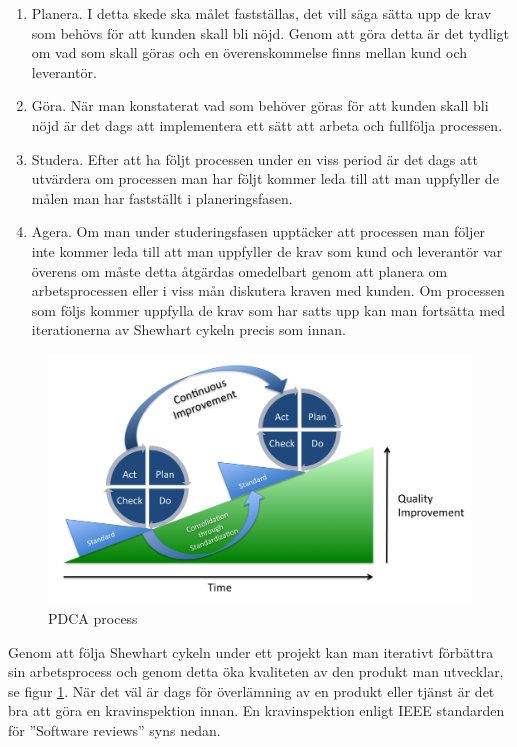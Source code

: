 \begin{enumerate}
  \item Planera. I detta skede ska målet fastställas, det vill säga sätta upp de krav som behövs för att kunden skall bli nöjd. Genom att göra detta är det tydligt om vad som skall göras och en överenskommelse finns mellan kund och leverantör. 
  \item Göra. När man konstaterat vad som behöver göras för att kunden skall bli nöjd är det dags att implementera ett sätt att arbeta och fullfölja processen.
  \item Studera. Efter att ha följt processen under en viss period är det dags att utvärdera om processen man har följt kommer leda till att man uppfyller de målen man har fastställt i planeringsfasen.
  \item Agera. Om man under studeringsfasen upptäcker att processen man följer inte kommer leda till att man uppfyller de krav som kund och leverantör var överens om måste detta åtgärdas omedelbart genom att planera om arbetsprocessen eller i viss mån diskutera kraven med kunden. Om processen som följs kommer uppfylla de krav som har satts upp kan man fortsätta med iterationerna av Shewhart cykeln precis som innan.
\end{enumerate}
\begin{figure}[h]
\centerline{\includegraphics[scale=0.15]{ruben-tex/graphic/PDCA_Process}}
\caption{PDCA process \citep{Vietze}}
\label{fig:pdcaprocess}
\end{figure}
\noindent Genom att följa Shewhart cykeln under ett projekt kan man iterativt förbättra sin arbetsprocess och genom detta öka kvaliteten av den produkt man utvecklar, se figur \ref{fig:pdcaprocess}.
\newline
\newline
När det väl är dags för överlämning av en produkt eller tjänst är det bra att göra en kravinspektion innan. En kravinspektion enligt IEEE standarden för ''Software reviews'' syns nedan.

